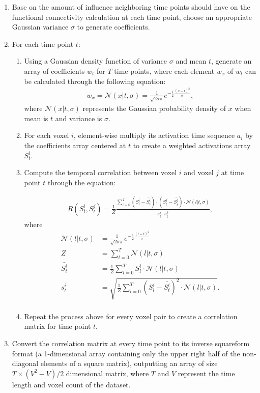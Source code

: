 \documentclass[11pt]{article}
\begin{document}
\begin{enumerate}
\item Base on the amount of influence neighboring time points should have on the functional connectivity calculation at each time point, choose an appropriate Gaussian variance $\sigma$ to generate coefficients.

\item For each time point $t$:
\begin{enumerate}
\item Using a Gaussian density function of variance $\sigma$ and mean $t$, generate an array of coefficients $w_t$ for $T$ time points, where each element $w_x$ of $w_t$ can be calculated through the following equation:
\begin{align*}
w_x = \mathcal{N}(x|t,\sigma) = \frac{1}{\sqrt{2\sigma\pi}}e^{-\frac12 \frac{(x-t)^2}{\sigma}},
\end{align*}
where $\mathcal{N}(x|t,\sigma)$ represents the Gaussian probability density of $x$ when mean is $t$ and variance is $\sigma$.

\item For each voxel $i$, element-wise multiply its activation time sequence $a_i$ by the coefficients array centered at $t$ to create a weighted activations array $S^i_t$.

\item Compute the temporal correlation between voxel $i$ and voxel $j$ at time point $t$ through the equation:

\begin{align*}
R(S^i_t,S^j_t) = \frac{1}{Z}\frac{\sum_{l=0}^T (S_l^i - \bar{S^i_t})\cdot(S^j_l - \bar{S^j_t})\cdot \mathcal{N}(l|t,\sigma)}{s_t^i \cdot s_t^j},
\end{align*}
where
\begin{align*}
\mathcal{N}(l|t,\sigma) &= \frac{1}{\sqrt{2\sigma\pi}}e^{-\frac12 \frac{(l-t)^2}{\sigma}}\\
Z &= \sum_{l=0}^T \mathcal{N}(l|t,\sigma)\\
\bar{S^i_t} &=\frac{1}{Z} \sum_{l=0}^T S^i_l \cdot \mathcal{N}(l|t,\sigma)\\
s_t^i &=\sqrt{ \frac{1}{Z}\sum_{l=0}^T (S_l^i-\bar{S_t^i})^2 \cdot \mathcal{N}(l|t,\sigma)}.\\
\end{align*}
\item Repeat the process above for every voxel pair to create a correlation matrix for time point $t$.
\end{enumerate}
\item Convert the correlation matrix at every time point to its inverse squareform format (a 1-dimensional array containing only the upper right half of the non-diagonal elements of a square matrix), outputting an array of size $T\times (V^2-V)/2$ dimensional matrix, where $T$ and $V$ represent the time length and voxel count of the dataset.
\end{enumerate}
\end{document}
